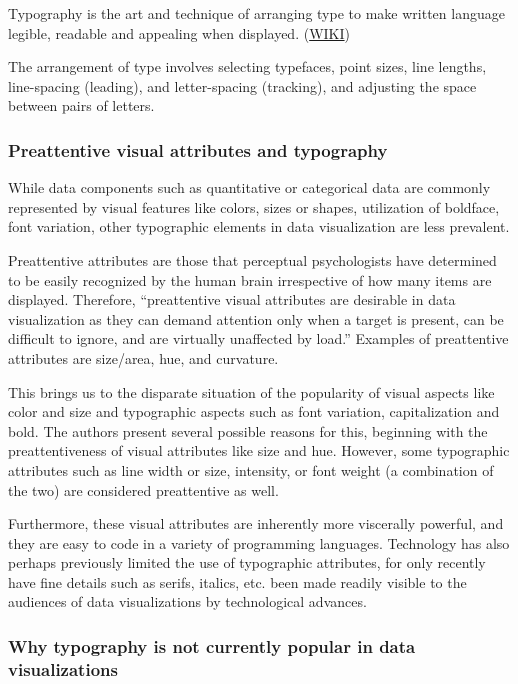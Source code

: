 \documentclass[]{book}
\begin{document}
Typography is the art and technique of arranging type to make written language legible, readable and appealing when displayed. (\href{https://en.wikipedia.org/wiki/Typography}{WIKI})

The arrangement of type involves selecting typefaces, point sizes, line lengths, line-spacing (leading), and letter-spacing (tracking), and adjusting the space between pairs of letters.

\hypertarget{preattentive-visual-attributes-and-typography}{%
\subsubsection{Preattentive visual attributes and typography}\label{preattentive-visual-attributes-and-typography}}

While data components such as quantitative or categorical data are commonly represented by visual features like colors, sizes or shapes, utilization of boldface, font variation, other typographic elements in data visualization are less prevalent.

Preattentive attributes are those that perceptual psychologists have determined to be easily recognized by the human brain irrespective of how many items are displayed. Therefore, ``preattentive visual attributes are desirable in data visualization as they can demand attention only when a target is present, can be difficult to ignore, and are virtually unaffected by load.'' Examples of preattentive attributes are size/area, hue, and curvature.

This brings us to the disparate situation of the popularity of visual aspects like color and size and typographic aspects such as font variation, capitalization and bold. The authors present several possible reasons for this, beginning with the preattentiveness of visual attributes like size and hue. However, some typographic attributes such as line width or size, intensity, or font weight (a combination of the two) are considered preattentive as well.

Furthermore, these visual attributes are inherently more viscerally powerful, and they are easy to code in a variety of programming languages. Technology has also perhaps previously limited the use of typographic attributes, for only recently have fine details such as serifs, italics, etc. been made readily visible to the audiences of data visualizations by technological advances.

\hypertarget{why-typography-is-not-currently-popular-in-data-visualizations}{%
\subsubsection{Why typography is not currently popular in data visualizations}\label{why-typography-is-not-currently-popular-in-data-visualizations}}
\end{document}
